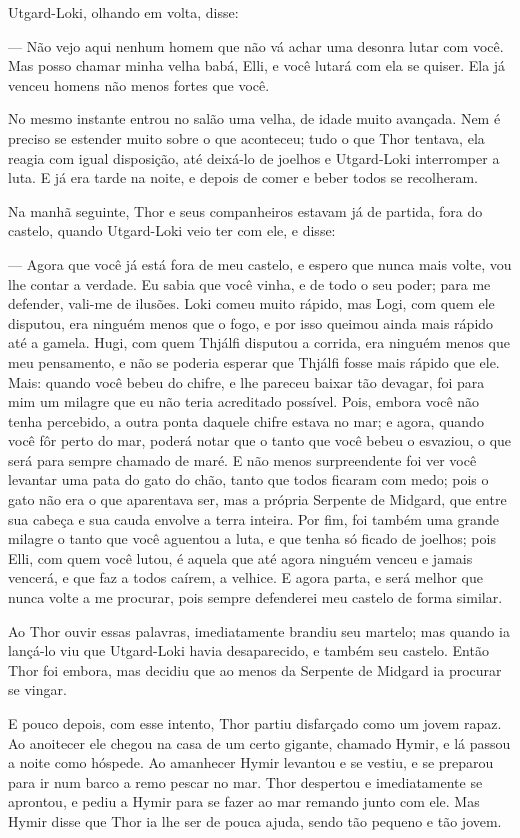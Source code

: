 Utgard-Loki, olhando em volta, disse:

— Não vejo aqui nenhum homem que não vá achar uma desonra lutar com
você. Mas posso chamar minha velha babá, Elli, e você lutará com ela
se quiser. Ela já venceu homens não menos fortes que você. 

No mesmo instante entrou no salão uma velha, de idade muito avançada.
Nem é preciso se estender muito sobre o que aconteceu; tudo o que
Thor tentava, ela reagia com igual disposição, até deixá-lo de
joelhos e Utgard-Loki interromper a luta. E já era tarde na noite, e
depois de comer e beber todos se recolheram.

Na manhã seguinte, Thor e seus companheiros estavam já de partida,
fora do castelo, quando Utgard-Loki veio ter com ele, e disse:

— Agora que você já está fora de meu castelo, e espero que nunca mais
volte, vou lhe contar a verdade. Eu sabia que você vinha, e de todo o
seu poder; para me defender, vali-me de ilusões. Loki comeu muito
rápido, mas Logi, com quem ele disputou, era ninguém menos que o
fogo, e por isso queimou ainda mais rápido até a gamela. Hugi, com
quem Thjálfi disputou a corrida, era ninguém menos que meu
pensamento, e não se poderia esperar que Thjálfi fosse mais rápido
que ele. Mais: quando você bebeu do chifre, e lhe pareceu baixar tão
devagar, foi para mim um milagre que eu não teria acreditado
possível. Pois, embora você não tenha percebido, a outra ponta
daquele chifre estava no mar; e agora, quando você fôr perto do mar,
poderá notar que o tanto que você bebeu o esvaziou, o que será para
sempre chamado de maré. E não menos surpreendente foi ver você
levantar uma pata do gato do chão, tanto que todos ficaram com medo;
pois o gato não era o que aparentava ser, mas a própria Serpente de
Midgard, que entre sua cabeça e sua cauda envolve a terra inteira.
Por fim, foi também uma grande milagre o tanto que você aguentou a
luta, e que tenha só ficado de joelhos; pois Elli, com quem você
lutou, é aquela que até agora ninguém venceu e jamais vencerá, e que
faz a todos caírem, a velhice. E agora parta, e será melhor que nunca
volte a me procurar, pois sempre defenderei meu castelo de forma
similar. 

Ao Thor ouvir essas palavras, imediatamente brandiu seu martelo; mas
quando ia lançá-lo viu que Utgard-Loki havia desaparecido, e também
seu castelo. Então Thor foi embora, mas decidiu que ao menos da
Serpente de Midgard ia procurar se vingar. 

E pouco depois, com esse intento, Thor partiu disfarçado como um jovem
rapaz. Ao anoitecer ele chegou na casa de um certo gigante, chamado
Hymir, e lá passou a noite como hóspede. Ao amanhecer Hymir levantou
e se vestiu, e se preparou para ir num barco a remo pescar no mar.
Thor despertou e imediatamente se aprontou, e pediu a Hymir para se
fazer ao mar remando junto com ele. Mas Hymir disse que Thor ia lhe
ser de pouca ajuda, sendo tão pequeno e tão jovem. 

